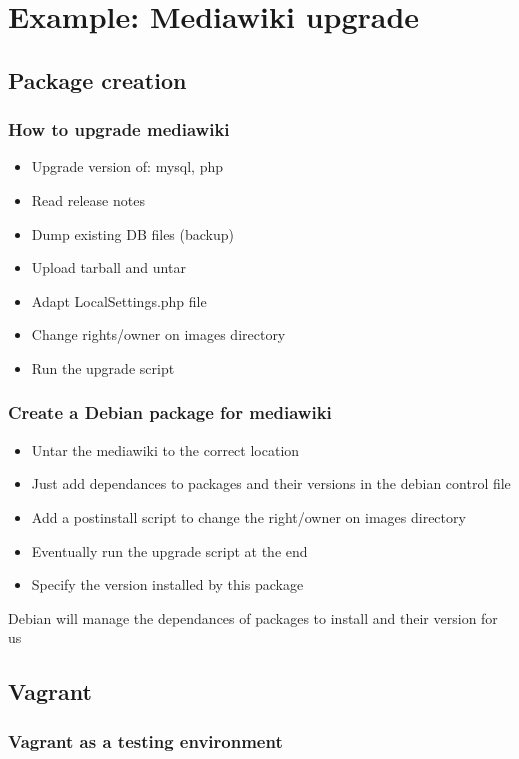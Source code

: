 \documentclass[11pt,compress]{beamer}
\begin{document}
\section{Example: Mediawiki upgrade}
\subsection{Package creation}
\begin{frame}
\frametitle{How to upgrade mediawiki}
\begin{itemize}
\item Upgrade version of: mysql, php
\item Read release notes
\item Dump existing DB files (backup)
\item Upload tarball and untar
\item Adapt LocalSettings.php file
\item Change rights/owner on images directory
\item Run the upgrade script
\end{itemize}
\end{frame}

\begin{frame}
\frametitle{Create a Debian package for mediawiki}
\begin{itemize}
\item Untar the mediawiki to the correct location
\item Just add dependances to packages and their versions in the debian control file
\item Add a postinstall script to change the right/owner on images directory
\item Eventually run the upgrade script at the end
\item Specify the version installed by this package
\end{itemize}
\begin{block}{}
Debian will manage the dependances of packages to install and their version for us
\end{block}
\end{frame}

\subsection{Vagrant}
\begin{frame}
\frametitle{Vagrant as a testing environment}
\end{frame}
\end{document}
